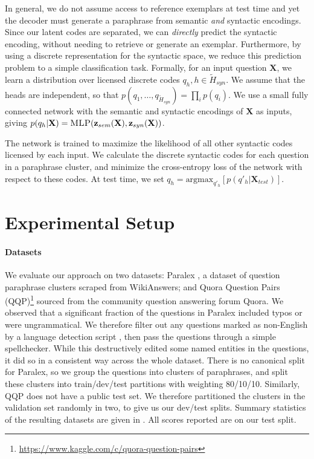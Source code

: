 \documentclass[11pt,a4paper]{article}
\begin{document}
In general, we do not assume access to reference exemplars at test
time and yet the decoder must generate a paraphrase from semantic
\emph{and} syntactic encodings.  Since our latent codes are separated,
we can \emph{directly} predict the syntactic encoding, without needing
to retrieve or generate an exemplar. Furthermore, by using a discrete
representation for the syntactic space, we reduce this prediction
problem to a simple classification task. Formally, for an input
question $\textbf{X}$, we learn a distribution over licensed discrete
codes $q_h, h \in \tilde{H}_{syn}$. We assume that the heads are
independent, so that $p(q_1,\ldots,q_{\tilde{H}_{syn}}) = \prod_{i}
p(q_i)$. We use a small fully connected network with the semantic and
syntactic encodings of $\textbf{X}$ as inputs, giving $p(q_h |
\textbf{X}) = \textsc{MLP}(\textbf{z}_{sem}(\textbf{X}),
\textbf{z}_{syn}(\textbf{X}))$.

The network is trained to maximize the likelihood of all other
syntactic codes licensed by each input. We calculate the discrete
syntactic codes for each question in a paraphrase cluster, and
minimize the cross-entropy loss of the network with respect to these
codes. At test time, we set $q_h = \text{argmax}_{q'_h} [p(q'_h |
\textbf{X}_{test})]$.













\section{Experimental Setup}

\paragraph{Datasets}

We evaluate our approach on two datasets: Paralex
\cite{fader-etal-2013-paraphrase}, a dataset of question paraphrase
clusters scraped from WikiAnswers; and Quora Question Pairs
(QQP)\footnote{\mbox{\url{https://www.kaggle.com/c/quora-question-pairs}}}
sourced from the community question answering forum Quora.  We
observed that a significant fraction of the questions in Paralex
included typos or were ungrammatical. We therefore filter out any
questions marked as non-English by a language detection script
\cite{lui-baldwin-2012-langid}, then pass the questions through a
simple spellchecker. While this destructively edited some named
entities in the questions, it did so in a consistent way across the
whole dataset. There is no canonical split for Paralex, so we group
the questions into clusters of paraphrases, and split these clusters
into train/dev/test partitions with weighting 80/10/10. Similarly, QQP
does not have a public test set. We therefore partitioned the
clusters in the validation set randomly in two, to give us our
dev/test splits. Summary statistics of the resulting datasets are
given in .  All scores reported are on our test
split.
\end{document}
